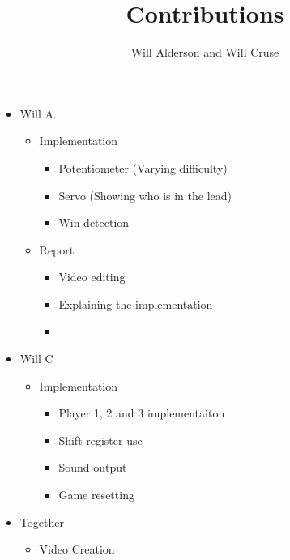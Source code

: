 \documentclass{article}
\title{Contributions}
\author{Will Alderson and Will Cruse}
\begin{document}
  \maketitle
  \newpage
  \begin{itemize}
    \item Will A.
      \begin{itemize}
      \item Implementation
        \begin{itemize}
          \item Potentiometer (Varying difficulty)
          \item Servo (Showing who is in the lead)
          \item Win detection 
        \end{itemize}
        \item Report
          \begin{itemize}
            \item Video editing
            \item Explaining the implementation
            \item 
        \end{itemize}
      \end{itemize}
    \item Will C
      \begin{itemize}
        \item Implementation
        \begin{itemize}
          \item Player 1, 2 and 3 implementaiton
          \item Shift register use
          \item Sound output
          \item Game resetting
          \end{itemize}
  
      \end{itemize}
    \item Together
      \begin{itemize}
        \item Video Creation
      \end{itemize}
    \end{itemize}
\end{document}
